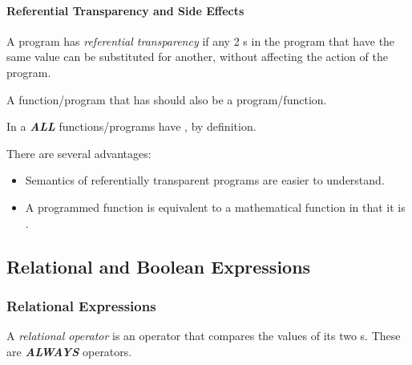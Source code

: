 \paragraph{Referential Transparency and Side Effects}\label{par:Operand_Evaluation-Referential_Transparency_Side_Effects}
\begin{definition}\label{def:Referential_Transparency}
  A program has \emph{referential transparency} if any 2 s in the program that have the same value can be substituted for another, without affecting the action of the program.

  \begin{remark}
    A function/program that has  should also be a  program/function.
  \end{remark}

  \begin{remark}
    In a  \textbf{\emph{ALL}} functions/programs have , by definition.
  \end{remark}
\end{definition}

There are several advantages:
\begin{itemize}[noitemsep]
\item Semantics of referentially transparent programs are easier to understand.
\item A programmed function is equivalent to a mathematical function in that it is .
\end{itemize}

\subsection{Relational and Boolean Expressions}\label{subsec:Relational_Boolean_Expressions}
\subsubsection{Relational Expressions}\label{subsubsec:Relational_Expressions}
\begin{definition}\label{def:Relational_Operator}
  A \emph{relational operator} is an operator that compares the values of its two s.
  These are \textbf{\emph{ALWAYS}}  operators.
\end{definition}

